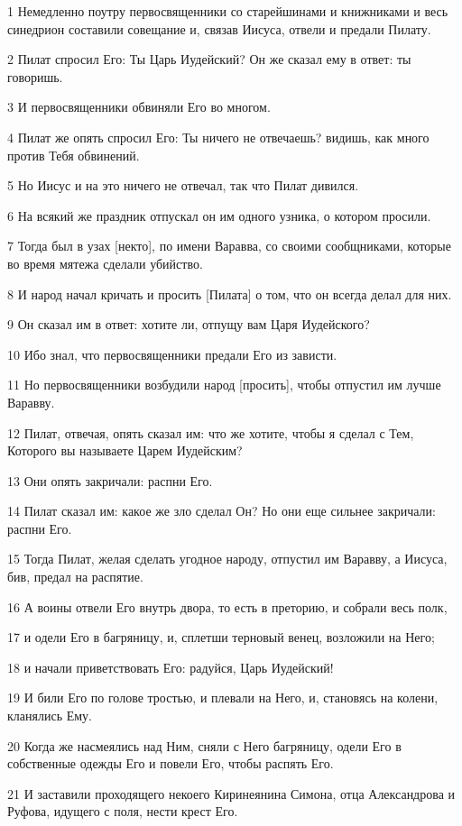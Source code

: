 \par 1 Немедленно поутру первосвященники со старейшинами и книжниками и весь синедрион составили совещание и, связав Иисуса, отвели и предали Пилату.
\par 2 Пилат спросил Его: Ты Царь Иудейский? Он же сказал ему в ответ: ты говоришь.
\par 3 И первосвященники обвиняли Его во многом.
\par 4 Пилат же опять спросил Его: Ты ничего не отвечаешь? видишь, как много против Тебя обвинений.
\par 5 Но Иисус и на это ничего не отвечал, так что Пилат дивился.
\par 6 На всякий же праздник отпускал он им одного узника, о котором просили.
\par 7 Тогда был в узах [некто], по имени Варавва, со своими сообщниками, которые во время мятежа сделали убийство.
\par 8 И народ начал кричать и просить [Пилата] о том, что он всегда делал для них.
\par 9 Он сказал им в ответ: хотите ли, отпущу вам Царя Иудейского?
\par 10 Ибо знал, что первосвященники предали Его из зависти.
\par 11 Но первосвященники возбудили народ [просить], чтобы отпустил им лучше Варавву.
\par 12 Пилат, отвечая, опять сказал им: что же хотите, чтобы я сделал с Тем, Которого вы называете Царем Иудейским?
\par 13 Они опять закричали: распни Его.
\par 14 Пилат сказал им: какое же зло сделал Он? Но они еще сильнее закричали: распни Его.
\par 15 Тогда Пилат, желая сделать угодное народу, отпустил им Варавву, а Иисуса, бив, предал на распятие.
\par 16 А воины отвели Его внутрь двора, то есть в преторию, и собрали весь полк,
\par 17 и одели Его в багряницу, и, сплетши терновый венец, возложили на Него;
\par 18 и начали приветствовать Его: радуйся, Царь Иудейский!
\par 19 И били Его по голове тростью, и плевали на Него, и, становясь на колени, кланялись Ему.
\par 20 Когда же насмеялись над Ним, сняли с Него багряницу, одели Его в собственные одежды Его и повели Его, чтобы распять Его.
\par 21 И заставили проходящего некоего Киринеянина Симона, отца Александрова и Руфова, идущего с поля, нести крест Его.
